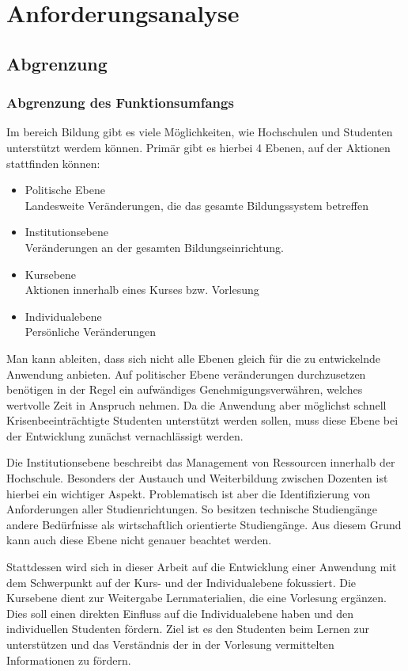 \chapter{Anforderungsanalyse} %
\section{Abgrenzung}
\subsection{Abgrenzung des Funktionsumfangs}
Im bereich Bildung gibt es viele Möglichkeiten, wie Hochschulen und Studenten unterstützt werdem können.
Primär gibt es hierbei 4 Ebenen, auf der Aktionen stattfinden können:
\begin{itemize}
    \item Politische Ebene\\
        Landesweite Veränderungen, die das gesamte Bildungssystem betreffen 
    \item Institutionsebene\\
        Veränderungen an der gesamten Bildungseinrichtung.
    \item Kursebene\\
        Aktionen innerhalb eines Kurses bzw. Vorlesung
    \item Individualebene\\
        Persönliche Veränderungen
\end{itemize}
Man kann ableiten, dass sich nicht alle Ebenen gleich für die zu entwickelnde Anwendung anbieten.
Auf politischer Ebene veränderungen durchzusetzen benötigen in der Regel ein aufwändiges Genehmigungsverwähren, welches wertvolle Zeit in Anspruch nehmen.
Da die Anwendung aber möglichst schnell Krisenbeeinträchtigte Studenten unterstützt werden sollen, muss diese Ebene bei der Entwicklung zunächst vernachlässigt werden.

Die Institutionsebene beschreibt das Management von Ressourcen innerhalb der Hochschule.
Besonders der Austauch und Weiterbildung zwischen Dozenten ist hierbei ein wichtiger Aspekt.
Problematisch ist aber die Identifizierung von Anforderungen aller Studienrichtungen.
So besitzen technische Studiengänge andere Bedürfnisse als wirtschaftlich orientierte Studiengänge.
Aus diesem Grund kann auch diese Ebene nicht genauer beachtet werden.

Stattdessen wird sich in dieser Arbeit auf die Entwicklung einer Anwendung mit dem Schwerpunkt auf der Kurs- und der Individualebene fokussiert.
Die Kursebene dient zur Weitergabe Lernmaterialien, die eine Vorlesung ergänzen.
Dies soll einen direkten Einfluss auf die Individualebene haben und den individuellen Studenten fördern.
Ziel ist es den Studenten beim Lernen zur unterstützen und das Verständnis der in der Vorlesung vermittelten Informationen zu fördern.  

